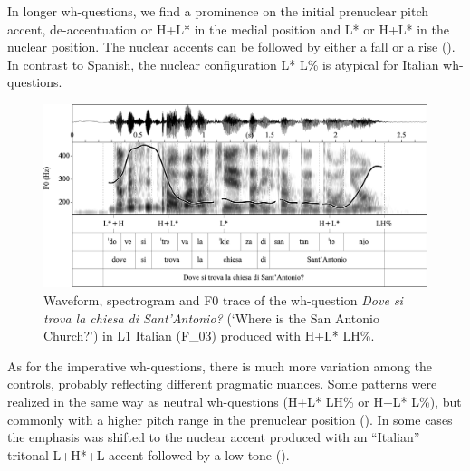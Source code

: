 In longer wh-questions, we find a prominence on the initial prenuclear pitch accent, de-accentuation or H+L* in the medial position and L* or H+L* in the nuclear position. The nuclear accents can be followed by either a fall or a rise (). In contrast to Spanish, the nuclear configuration L* L\% is atypical for Italian wh-questions.

\begin{figure}


\includegraphics[width=\textwidth]{figures/Figure_4.99.png}


\caption{Waveform, spectrogram and F0 trace of the wh-question \textit{Dove si trova la chiesa di Sant’Antonio?} (‘Where is the San Antonio Church?’) in L1 Italian (F\_03) produced with H+L* LH\%.}
\label{fig:4.99}
\end{figure}

As for the imperative wh-questions, there is much more variation among the controls, probably reflecting different pragmatic nuances. Some patterns were realized in the same way as neutral wh-questions (H+L* LH\% or H+L* L\%), but commonly with a higher pitch range in the prenuclear position (). In some cases the emphasis was shifted to the nuclear accent produced with an “Italian” tritonal L+H*+L accent followed by a low tone ().

